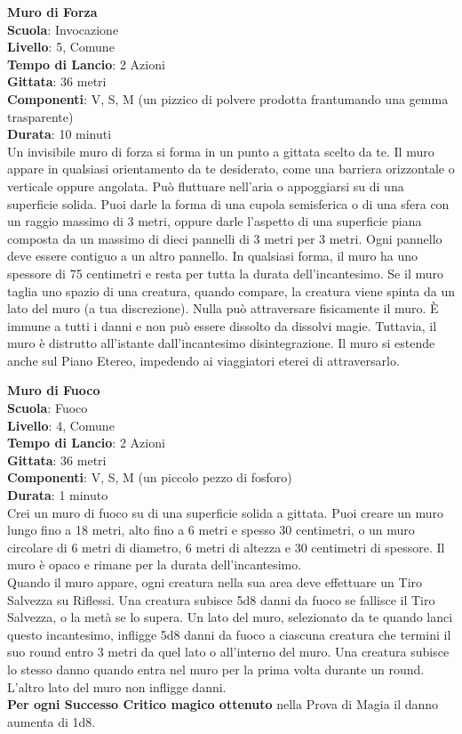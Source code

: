 \begin{multicols}{2}
\medskip\textbf{Muro di Forza}\\
\textbf{Scuola}: Invocazione\\
\textbf{Livello}: 5, Comune\\
\textbf{Tempo di Lancio}: 2 Azioni\\
\textbf{Gittata}: 36 metri\\
\textbf{Componenti}: V, S, M (un pizzico di polvere prodotta frantumando una gemma trasparente)\\
\textbf{Durata}: 10 minuti\\
Un invisibile muro di forza si forma in un punto a gittata scelto da te. Il muro appare in qualsiasi orientamento da te desiderato, come una barriera orizzontale o verticale oppure angolata. Può fluttuare nell'aria o appoggiarsi su di una superficie solida. Puoi darle la forma di una cupola semisferica o di una sfera con un raggio massimo di 3 metri, oppure darle l'aspetto di una superficie piana composta da un massimo di dieci pannelli di 3 metri per 3 metri. Ogni pannello deve essere contiguo a un altro pannello. In qualsiasi forma, il muro ha uno spessore di 75 centimetri e resta per tutta la durata dell'incantesimo. Se il muro taglia uno spazio di una creatura, quando compare, la creatura viene spinta da un lato del muro (a tua discrezione). Nulla può attraversare fisicamente il muro. È immune a tutti i danni e non può essere dissolto da dissolvi magie. Tuttavia, il muro è distrutto all'istante dall'incantesimo disintegrazione. Il muro si estende anche sul Piano Etereo, impedendo ai viaggiatori eterei di attraversarlo.

\medskip\textbf{Muro di Fuoco}\\
\textbf{Scuola}: Fuoco\\
\textbf{Livello}: 4, Comune\\
\textbf{Tempo di Lancio}: 2 Azioni\\
\textbf{Gittata}: 36 metri\\
\textbf{Componenti}: V, S, M (un piccolo pezzo di fosforo)\\
\textbf{Durata}: 1 minuto\\
Crei un muro di fuoco su di una superficie solida a gittata. Puoi creare un muro lungo fino a 18 metri, alto fino a 6 metri e spesso 30 centimetri, o un muro circolare di 6 metri di diametro, 6 metri di altezza e 30 centimetri di spessore. Il muro è opaco e rimane per la durata dell'incantesimo. \\
Quando il muro appare, ogni creatura nella sua area deve effettuare un Tiro Salvezza su Riflessi. Una creatura subisce 5d8 danni da fuoco se fallisce il Tiro Salvezza, o la metà se lo supera. Un lato del muro, selezionato da te quando lanci questo incantesimo, infligge 5d8 danni da fuoco a ciascuna creatura che termini il suo round entro 3 metri da quel lato o all'interno del muro. Una creatura subisce lo stesso danno quando entra nel muro per la prima volta durante un round. L'altro lato del muro non infligge danni.\\
\textbf{Per ogni Successo Critico magico ottenuto} nella Prova di Magia il danno aumenta di 1d8.


\end{multicols}
